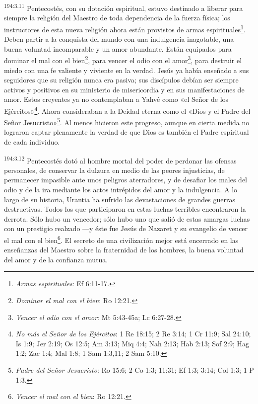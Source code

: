 \par 
\textsuperscript{194:3.11} Pentecostés, con su dotación espiritual, estuvo destinado a liberar para siempre la religión del Maestro de toda dependencia de la fuerza física; los instructores de esta nueva religión ahora están provistos de armas espirituales\footnote{\textit{Armas espirituales}: Ef 6:11-17.}. Deben partir a la conquista del mundo con una indulgencia inagotable, una buena voluntad incomparable y un amor abundante. Están equipados para dominar el mal con el bien\footnote{\textit{Dominar el mal con el bien}: Ro 12:21.}, para vencer el odio con el amor\footnote{\textit{Vencer el odio con el amor}: Mt 5:43-45a; Lc 6:27-28.}, para destruir el miedo con una fe valiente y viviente en la verdad. Jesús ya había enseñado a sus seguidores que su religión nunca era pasiva; sus discípulos debían ser siempre activos y positivos en su ministerio de misericordia y en sus manifestaciones de amor. Estos creyentes ya no contemplaban a Yahvé como «el Señor de los Ejércitos»\footnote{\textit{No más el Señor de los Ejércitos}: 1 Re 18:15; 2 Re 3:14; 1 Cr 11:9; Sal 24:10; Is 1:9; Jer 2:19; Os 12:5; Am 3:13; Miq 4:4; Nah 2:13; Hab 2:13; Sof 2:9; Hag 1:2; Zac 1:4; Mal 1:8; 1 Sam 1:3,11; 2 Sam 5:10.}. Ahora consideraban a la Deidad eterna como el «Dios y el Padre del Señor Jesucristo»\footnote{\textit{Padre del Señor Jesucristo}: Ro 15:6; 2 Co 1:3; 11:31; Ef 1:3; 3:14; Col 1:3; 1 P 1:3.}. Al menos hicieron este progreso, aunque en cierta medida no lograron captar plenamente la verdad de que Dios es también el Padre espiritual de cada individuo.

\par 
\textsuperscript{194:3.12} Pentecostés dotó al hombre mortal del poder de perdonar las ofensas personales, de conservar la dulzura en medio de las peores injusticias, de permanecer impasible ante unos peligros aterradores, y de desafiar los males del odio y de la ira mediante los actos intrépidos del amor y la indulgencia. A lo largo de su historia, Urantia ha sufrido las devastaciones de grandes guerras destructivas. Todos los que participaron en estas luchas terribles encontraron la derrota. Sólo hubo un vencedor; sólo hubo uno que salió de estas amargas luchas con un prestigio realzado ---y éste fue Jesús de Nazaret y su evangelio de vencer el mal con el bien\footnote{\textit{Vencer el mal con el bien}: Ro 12:21.}. El secreto de una civilización mejor está encerrado en las enseñanzas del Maestro sobre la fraternidad de los hombres, la buena voluntad del amor y de la confianza mutua.

